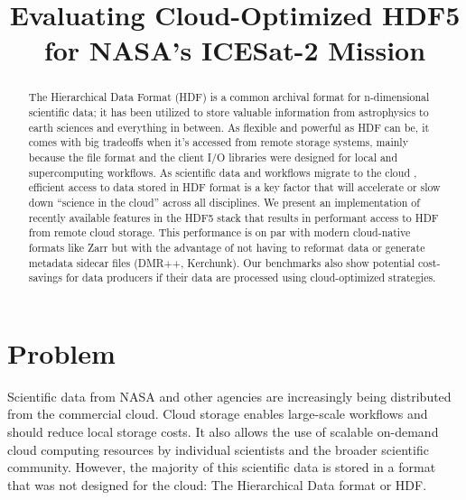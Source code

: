 \documentclass[
]{agujournal2019}
\begin{document}
\title{Evaluating Cloud-Optimized HDF5 for NASA's ICESat-2 Mission}




\begin{abstract}
The Hierarchical Data Format (HDF) is a common archival format for
n-dimensional scientific data; it has been utilized to store valuable
information from astrophysics to earth sciences and everything in
between. As flexible and powerful as HDF can be, it comes with big
tradeoffs when it's accessed from remote storage systems, mainly because
the file format and the client I/O libraries were designed for local and
supercomputing workflows. As scientific data and workflows migrate to
the cloud , efficient access to data stored in HDF format is a key
factor that will accelerate or slow down ``science in the cloud'' across
all disciplines. We present an implementation of recently available
features in the HDF5 stack that results in performant access to HDF from
remote cloud storage. This performance is on par with modern
cloud-native formats like Zarr but with the advantage of not having to
reformat data or generate metadata sidecar files (DMR++, Kerchunk). Our
benchmarks also show potential cost-savings for data producers if their
data are processed using cloud-optimized strategies.
\end{abstract}





\section{Problem}\label{problem}

Scientific data from NASA and other agencies are increasingly being
distributed from the commercial cloud. Cloud storage enables large-scale
workflows and should reduce local storage costs. It also allows the use
of scalable on-demand cloud computing resources by individual scientists
and the broader scientific community. However, the majority of this
scientific data is stored in a format that was not designed for the
cloud: The Hierarchical Data format or HDF.
\end{document}
